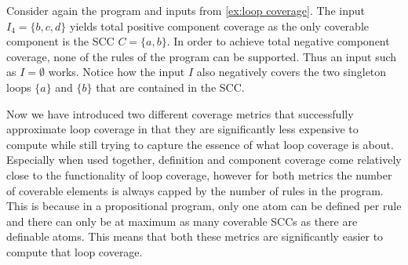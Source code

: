 \begin{example}
\label{ex:component coverage}
    Consider again the program and inputs from \cref{ex:loop coverage}. The input \(I_4 = \{b, c, d\}\) yields total positive component coverage as the only coverable component is the SCC \(C = \{a, b\}\). In order to achieve total negative component coverage, none of the rules of the program can be supported. Thus an input such as \(I = \emptyset\) works. Notice how the input $I$ also negatively covers the two singleton loops \(\{a\}\) and \(\{b\}\) that are contained in the SCC.
\end{example}

Now we have introduced two different coverage metrics that successfully approximate loop coverage in that they are significantly less expensive to compute while still trying to capture the essence of what loop coverage is about. Especially when used together, definition and component coverage come relatively close to the functionality of loop coverage, however for both metrics the number of coverable elements is always capped by the number of rules in the program. This is because in a propositional program, only one atom can be defined per rule and there can only be at maximum as many coverable SCCs as there are definable atoms. This means that both these metrics are significantly easier to compute that loop coverage.

